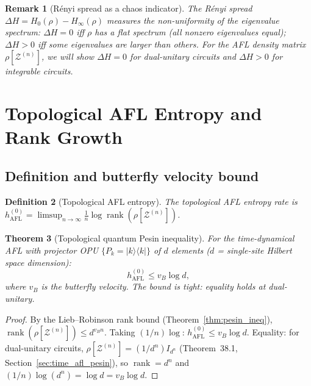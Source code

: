 \documentclass[12pt,a4paper]{article}
\newtheorem{theorem}{Theorem}[section]
\newtheorem{definition}[theorem]{Definition}
\newtheorem{remark}[theorem]{Remark}
\begin{document}
\begin{remark}[R\'enyi spread as a chaos indicator]
  The \emph{R\'enyi spread} $\Delta H = H_0(\rho) - H_\infty(\rho)$
  measures the non-uniformity of the eigenvalue spectrum:
  $\Delta H = 0$ iff $\rho$ has a flat spectrum (all nonzero
  eigenvalues equal); $\Delta H > 0$ iff some eigenvalues are larger
  than others.  For the AFL density matrix $\rho[\mathcal{Z}^{(n)}]$,
  we will show $\Delta H = 0$ for dual-unitary circuits and $\Delta H > 0$
  for integrable circuits.
\end{remark}

\section{Topological AFL Entropy and Rank Growth}
\label{sec:topological_entropy}

\subsection{Definition and butterfly velocity bound}

\begin{definition}[Topological AFL entropy]
  \label{def:topological_afl}
  The \emph{topological AFL entropy rate} is $h_{\mathrm{AFL}}^{(0)} =
  \limsup_{n\to\infty}\frac{1}{n}\log\operatorname{rank}(\rho[\mathcal{Z}^{(n)}])$.
\end{definition}

\begin{theorem}[Topological quantum Pesin inequality]
  \label{thm:topological_pesin}
  For the time-dynamical AFL with projector OPU $\{P_k = |k\rangle\langle k|\}$
  of $d$ elements ($d$ = single-site Hilbert space dimension):
  \begin{equation}
    \label{eq:topological_bound}
    h_{\mathrm{AFL}}^{(0)} \leq v_B\log d,
  \end{equation}
  where $v_B$ is the butterfly velocity.  The bound is tight: equality holds
  at dual-unitary.
\end{theorem}
\begin{proof}
  By the Lieb--Robinson rank bound (Theorem~\ref{thm:pesin_ineq}),
  $\operatorname{rank}(\rho[\mathcal{Z}^{(n)}]) \leq d^{v_B n}$.
  Taking $(1/n)\log$: $h_{\mathrm{AFL}}^{(0)} \leq v_B\log d$.
  Equality: for dual-unitary circuits, $\rho[\mathcal{Z}^{(n)}] = (1/d^n)I_{d^n}$
  (Theorem~38.1, Section~\ref{sec:time_afl_pesin}), so
  $\operatorname{rank} = d^n$ and $(1/n)\log(d^n) = \log d = v_B\log d$.
\end{proof}
\end{document}
